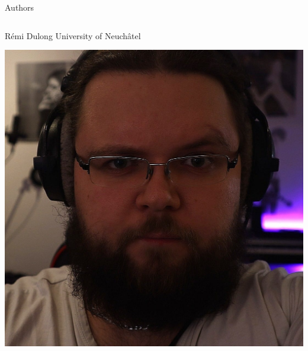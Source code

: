 \documentclass[presentation]{beamer}
\begin{document}
\begin{frame}[label={sec:orgadbd897}]{Authors}
\fontsize{5pt}{7pt}\\

\begin{block}{}
\begin{columns}
\begin{column}{0.2\columnwidth}
\begin{block}{Rémi Dulong}
University of Neuchâtel\\
\begin{center}
\includegraphics[width=.9\linewidth]{./IMGs/remi.jpg}
\end{center}
\end{block}
\end{column}


\end{columns}
\end{block}
\end{frame}
\end{document}
